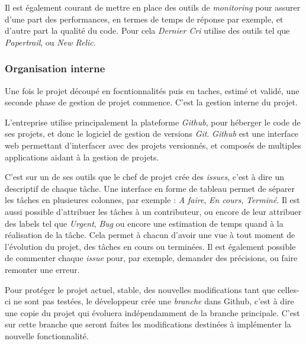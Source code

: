 \bigskip

Il est également courant de mettre en place des outils de
\emph{monitoring} pour assurer d'une part des performances, en termes de
temps de réponse par exemple, et d'autre part la qualité du code. Pour
cela \emph{Dernier Cri} utilise des outils tel que \emph{Papertrail}, ou
\emph{New Relic}.

\bigskip

\subsubsection{Organisation interne}\label{organisation-interne}

\bigskip

Une fois le projet découpé en focntionnalités puis en taches, estimé et
validé, une seconde phase de gestion de projet commence. C'est la
gestion interne du projet.

L'entreprise utilise principalement la plateforme \emph{Github}, pour
héberger le code de ses projets, et donc le logiciel de gestion de
versions \emph{Git}. \emph{Github} est une interface web permettant
d'interfacer avec des projets versionnés, et composés de multiples
applications aidant à la gestion de projets.

\bigskip

C'est sur un de ses outils que le chef de projet crée des \emph{issues},
c'est à dire un descriptif de chaque tâche. Une interface en forme de
tableau permet de séparer les tâches en plusieures colonnes, par exemple
: \emph{A faire}, \emph{En cours}, \emph{Terminé}. Il est aussi possible
d'attribuer les tâches à un contributeur, ou encore de leur attribuer
des labels tel que \emph{Urgent}, \emph{Bug} ou encore une estimation de
temps quand à la réalisation de la tâche. Cela permet à chacun d'avoir
une vue à tout moment de l'évolution du projet, des tâches en cours ou
terminées. Il est également possible de commenter chaque \emph{issue}
pour, par exemple, demander des précisions, ou faire remonter une
erreur.

\bigskip

Pour protéger le projet actuel, stable, des nouvelles modifications tant
que celles-ci ne sont pas testées, le développeur crée une
\emph{branche} dans Github, c'est à dire une copie du projet qui
évoluera indépendamment de la branche principale. C'est sur cette
branche que seront faites les modifications destinées à implémenter la
nouvelle fonctionnalité.

\bigskip

